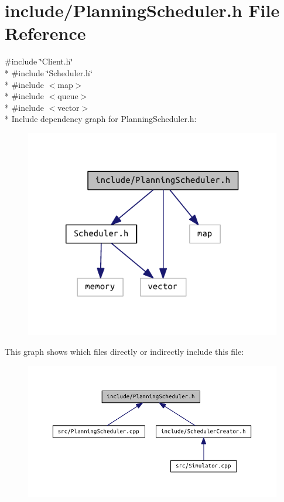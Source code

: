 \section{include/\+Planning\+Scheduler.h File Reference}
\label{_planning_scheduler_8h}
{\ttfamily \#include \char`\"{}Client.\+h\char`\"{}}\\*
{\ttfamily \#include \char`\"{}Scheduler.\+h\char`\"{}}\\*
{\ttfamily \#include $<$map$>$}\\*
{\ttfamily \#include $<$queue$>$}\\*
{\ttfamily \#include $<$vector$>$}\\*
Include dependency graph for Planning\+Scheduler.\+h\+:
\nopagebreak
\begin{figure}[H]
\begin{center}
\leavevmode
\includegraphics[width=350pt]{_planning_scheduler_8h__incl}
\end{center}
\end{figure}
This graph shows which files directly or indirectly include this file\+:
\nopagebreak
\begin{figure}[H]
\begin{center}
\leavevmode
\includegraphics[width=330pt]{_planning_scheduler_8h__dep__incl}
\end{center}
\end{figure}
